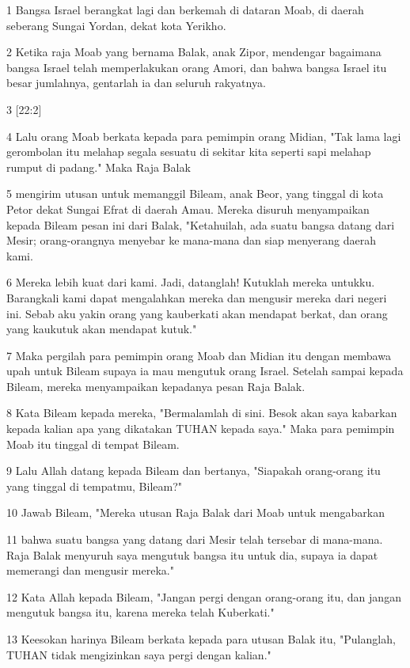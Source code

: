 \par 1 Bangsa Israel berangkat lagi dan berkemah di dataran Moab, di daerah seberang Sungai Yordan, dekat kota Yerikho.
\par 2 Ketika raja Moab yang bernama Balak, anak Zipor, mendengar bagaimana bangsa Israel telah memperlakukan orang Amori, dan bahwa bangsa Israel itu besar jumlahnya, gentarlah ia dan seluruh rakyatnya.
\par 3 [22:2]
\par 4 Lalu orang Moab berkata kepada para pemimpin orang Midian, "Tak lama lagi gerombolan itu melahap segala sesuatu di sekitar kita seperti sapi melahap rumput di padang." Maka Raja Balak
\par 5 mengirim utusan untuk memanggil Bileam, anak Beor, yang tinggal di kota Petor dekat Sungai Efrat di daerah Amau. Mereka disuruh menyampaikan kepada Bileam pesan ini dari Balak, "Ketahuilah, ada suatu bangsa datang dari Mesir; orang-orangnya menyebar ke mana-mana dan siap menyerang daerah kami.
\par 6 Mereka lebih kuat dari kami. Jadi, datanglah! Kutuklah mereka untukku. Barangkali kami dapat mengalahkan mereka dan mengusir mereka dari negeri ini. Sebab aku yakin orang yang kauberkati akan mendapat berkat, dan orang yang kaukutuk akan mendapat kutuk."
\par 7 Maka pergilah para pemimpin orang Moab dan Midian itu dengan membawa upah untuk Bileam supaya ia mau mengutuk orang Israel. Setelah sampai kepada Bileam, mereka menyampaikan kepadanya pesan Raja Balak.
\par 8 Kata Bileam kepada mereka, "Bermalamlah di sini. Besok akan saya kabarkan kepada kalian apa yang dikatakan TUHAN kepada saya." Maka para pemimpin Moab itu tinggal di tempat Bileam.
\par 9 Lalu Allah datang kepada Bileam dan bertanya, "Siapakah orang-orang itu yang tinggal di tempatmu, Bileam?"
\par 10 Jawab Bileam, "Mereka utusan Raja Balak dari Moab untuk mengabarkan
\par 11 bahwa suatu bangsa yang datang dari Mesir telah tersebar di mana-mana. Raja Balak menyuruh saya mengutuk bangsa itu untuk dia, supaya ia dapat memerangi dan mengusir mereka."
\par 12 Kata Allah kepada Bileam, "Jangan pergi dengan orang-orang itu, dan jangan mengutuk bangsa itu, karena mereka telah Kuberkati."
\par 13 Keesokan harinya Bileam berkata kepada para utusan Balak itu, "Pulanglah, TUHAN tidak mengizinkan saya pergi dengan kalian."
